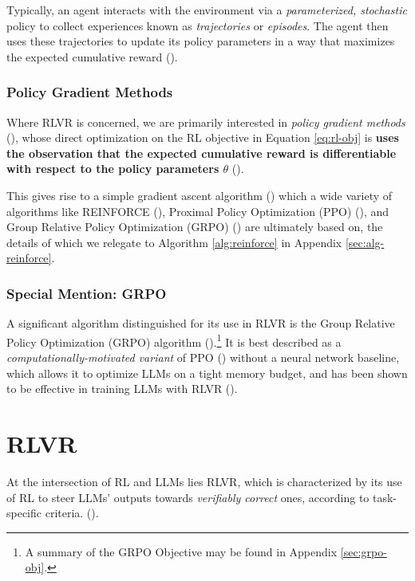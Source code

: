 \documentclass{article} %
\theoremstyle{definition}
\begin{document}
Typically, an agent interacts with the environment via a \textit{parameterized, stochastic} policy
to collect experiences known as \textit{trajectories} or \textit{episodes}.
The agent then uses these trajectories to update its policy parameters
in a way that maximizes the expected cumulative reward
(\cite{Sutton-and-Barto-1998, SpinningUp-2018, Levine-et-al-2023}).

\subsubsection{Policy Gradient Methods}
Where RLVR is concerned, we are primarily interested in \textit{policy gradient methods} (\cite{wk2, SpinningUp-2018, Weng-2018}),
whose direct optimization on the RL objective in Equation \eqref{eq:rl-obj} is \textbf{uses the
observation that the expected cumulative reward is differentiable with respect to the policy parameters $\theta$} (\cite{SpinningUp-2018,Levine-et-al-2023,Weng-2018}).

This gives rise to a simple gradient ascent algorithm (\cite{wk2}) which a wide variety of algorithms like
REINFORCE (\cite{Williams-1992}),
Proximal Policy Optimization (PPO) (\cite{ppo}),
and Group Relative Policy Optimization (GRPO) (\cite{grpo}) are ultimately based on,
the details of which we relegate to Algorithm \ref{alg:reinforce} in Appendix \ref{sec:alg-reinforce}.

\subsubsection{Special Mention: GRPO}
A significant algorithm distinguished for its use in RLVR
is the Group Relative Policy Optimization (GRPO) algorithm (\cite{grpo}).\footnote{
    A summary of the GRPO Objective may be found in Appendix \ref{sec:grpo-obj}.
}
It is best described as a \textit{computationally-motivated variant} of PPO (\cite{ppo}) without 
a neural network baseline, which allows it to optimize LLMs on a tight memory budget, and has
been shown to be effective in training LLMs with RLVR (\cite{grpo, r1}).

\section{RLVR} \label{sec:rlvr}

At the intersection of RL and LLMs lies RLVR, which is characterized
by its use of RL to steer LLMs' outputs towards \textit{verifiably correct} ones,
according to task-specific criteria.
(\cite{tulu3, grpo, r1}).
\end{document}
